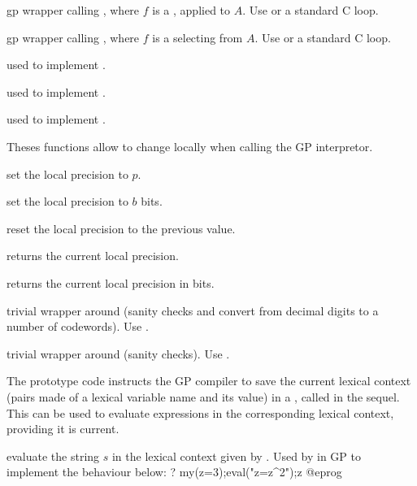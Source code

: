 
 gp wrapper calling , where $f$
is a , applied to $A$. Use  or a standard C loop.

 gp wrapper calling , where $f$
is a  selecting from $A$. Use  or a standard C loop.

 used to implement
\kbd{[a(x)|x<-b]}.

used to implement \kbd{[x<-b,c(x)]}.

used to implement \kbd{[a(x)|x<-b,c(x)]}.


Theses functions allow to change  locally when
calling the GP interpretor.

 set the local precision to $p$.

 set the local precision to $b$ bits.

 reset the local precision to the previous
value.

 returns the current local precision.

 returns the current local precision in bits.

 trivial wrapper around 
(sanity checks and convert from decimal digits to a number of codewords).
Use .

 trivial wrapper around 
(sanity checks). Use .


The prototype code  instructs the GP compiler to save the current
lexical context (pairs made of a lexical variable name and its value)
in a , called  in the sequel. This  can be used
to evaluate expressions in the corresponding lexical context, providing it is
current.

 evaluate the string $s$
in the lexical context given by .  Used by  in GP
to implement the behaviour below:
\bprog
? my(z=3);eval("z=z^2");z
@eprog

